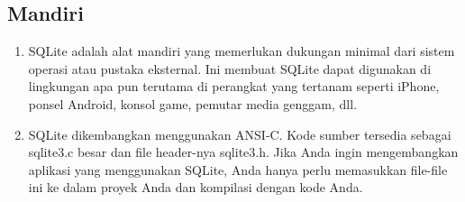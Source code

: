 		\subsection{Mandiri}
		\begin{enumerate}
		\item SQLite adalah alat mandiri yang memerlukan dukungan minimal dari sistem operasi atau pustaka eksternal. Ini membuat SQLite dapat digunakan di lingkungan apa pun terutama di perangkat yang tertanam seperti iPhone, ponsel Android, konsol game, pemutar media genggam, dll.
		\item SQLite dikembangkan menggunakan ANSI-C. Kode sumber tersedia sebagai sqlite3.c besar dan file header-nya sqlite3.h. Jika Anda ingin mengembangkan aplikasi yang menggunakan SQLite, Anda hanya perlu memasukkan file-file ini ke dalam proyek Anda dan kompilasi dengan kode Anda.
		\end{enumerate}
		
